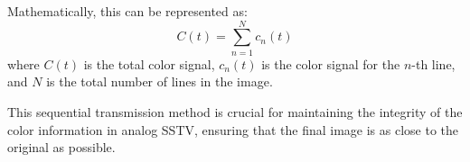 Mathematically, this can be represented as:
\[
C(t) = \sum_{n=1}^{N} c_n(t)
\]
where \( C(t) \) is the total color signal, \( c_n(t) \) is the color signal for the \( n \)-th line, and \( N \) is the total number of lines in the image.

This sequential transmission method is crucial for maintaining the integrity of the color information in analog SSTV, ensuring that the final image is as close to the original as possible.

